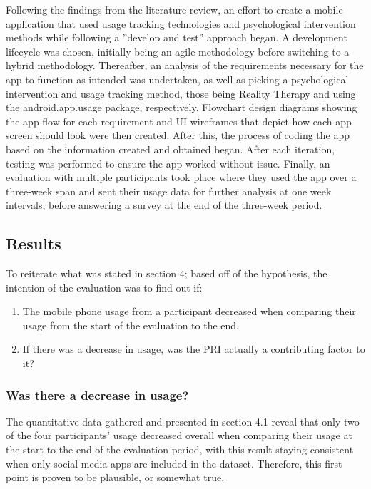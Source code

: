 \documentclass[12pt]{article}
\begin{document}
Following the findings from the literature review, an effort to create a mobile application that used usage tracking technologies and psychological intervention methods while following a 
”develop and test” approach began. A development lifecycle was chosen, initially being an agile methodology before switching to a hybrid methodology. Thereafter, an analysis of the requirements 
necessary for the app to function as intended was undertaken, as well as picking a psychological intervention and usage tracking method, those being Reality Therapy and using the
android.app.usage package, respectively. Flowchart design diagrams showing the app flow for each requirement and UI wireframes that depict how each app screen should look were then created. 
After this, the process of coding the app based on the information created and obtained began. After each iteration, testing was performed to ensure the app worked without issue. Finally, an 
evaluation with multiple participants took place where they used the app over a three-week span and sent their usage data for further analysis at one week intervals, before answering a survey 
at the end of the three-week period.

\subsection{Results}
To reiterate what was stated in section 4; based off of the hypothesis, the intention of the evaluation was to find out if:

\begin{enumerate}
	\item The mobile phone usage from a participant decreased when comparing their usage from the start of the evaluation to the end.
	\item If there was a decrease in usage, was the PRI actually a contributing factor to it?
\end{enumerate}

\subsubsection{Was there a decrease in usage?}
The quantitative data gathered and presented in section 4.1 reveal that only two of the four participants' usage decreased overall when comparing their usage at the start to 
the end of the evaluation period, with this result staying consistent when only social media apps are included in the dataset. Therefore, this first point is proven to be
plausible, or somewhat true.
\end{document}
